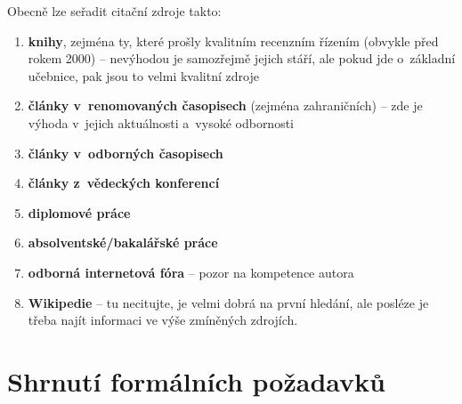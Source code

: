 Obecně lze seřadit citační zdroje takto\?:
\begin{enumerate}
    \item \textbf{knihy}, zejména ty, které prošly kvalitním recenzním řízením (obvykle před rokem 2000) -- ne\-vý\-ho\-dou je samozřejmě jejich stáří, ale pokud jde o~základní učebnice, pak jsou to velmi kvalitní zdroje
    \item \textbf{články v~renomovaných časopisech} (zejména zahraničních) -- zde je výhoda v~jejich aktuálnosti a~vysoké odbornosti
    \item \textbf{články v~odborných časopisech}
    \item \textbf{články z~vědeckých konferencí}
    \item \textbf{diplomové práce}
    \item \textbf{absolventské/bakalářské práce}
    \item \textbf{odborná internetová fóra} -- pozor na kompetence autora
    \item \textbf{Wikipedie} -- tu necitujte, je velmi dobrá na první hledání, ale posléze je třeba najít informaci ve výše zmíněných zdrojích.
\end{enumerate}



\section{Shrnutí formálních požadavků}

